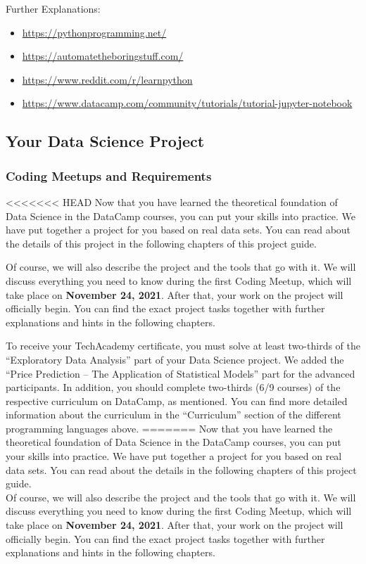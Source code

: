 \documentclass[
  11pt,
]{article}
\providecommand{\tightlist}{%
  \setlength{\itemsep}{0pt}\setlength{\parskip}{0pt}}
\begin{document}
Further Explanations:

\begin{itemize}
\tightlist
\item
  \url{https://pythonprogramming.net/}
\item
  \url{https://automatetheboringstuff.com/}
\item
  \url{https://www.reddit.com/r/learnpython}
\item
  \url{https://www.datacamp.com/community/tutorials/tutorial-jupyter-notebook}
\end{itemize}

\hypertarget{your-data-science-project}{%
\subsection{Your Data Science Project}\label{your-data-science-project}}

\hypertarget{coding-meetups-and-requirements}{%
\subsubsection{Coding Meetups and Requirements}\label{coding-meetups-and-requirements}}

<<<<<<< HEAD
Now that you have learned the theoretical foundation of Data Science in the DataCamp courses, you can put your skills into practice.
We have put together a project for you based on real data sets.
You can read about the details of this project in the following chapters of this project guide.

Of course, we will also describe the project and the tools that go with it.
We will discuss everything you need to know during the first Coding Meetup, which will take place on \textbf{November 24, 2021}.
After that, your work on the project will officially begin.
You can find the exact project tasks together with further explanations and hints in the following chapters.

To receive your TechAcademy certificate, you must solve at least two-thirds of the ``Exploratory Data Analysis'' part of your Data Science project.
We added the ``Price Prediction -- The Application of Statistical Models'' part for the advanced participants.
In addition, you should complete two-thirds (6/9 courses) of the respective curriculum on DataCamp, as mentioned.
You can find more detailed information about the curriculum in the ``Curriculum'' section of the different programming languages above.
=======
Now that you have learned the theoretical foundation of Data Science in the DataCamp courses, you can put your skills into practice. We have put together a project for you based on real data sets. You can read about the details in the following chapters of this project guide.\\
Of course, we will also describe the project and the tools that go with it. We will discuss everything you need to know during the first Coding Meetup, which will take place on \textbf{November 24, 2021}. After that, your work on the project will officially begin.
You can find the exact project tasks together with further explanations and hints in the following chapters.
\end{document}
